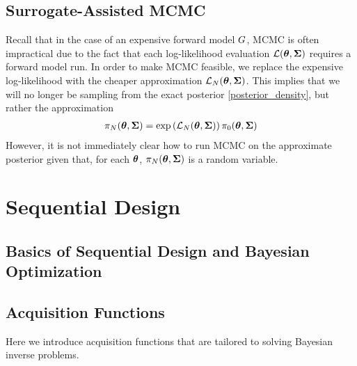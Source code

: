 \documentclass[12pt]{article}
\begin{document}
\subsection{Surrogate-Assisted MCMC}
Recall that in the case of an expensive forward model $G$, MCMC is often impractical due to the fact that each log-likelihood evaluation $\mathcal{L}(\boldsymbol{\theta}, \boldsymbol{\Sigma})$ requires a forward model 
 run. In order to make MCMC feasible, we replace the expensive log-likelihood with the cheaper approximation $\mathcal{L}_{N}(\boldsymbol{\theta}, \boldsymbol{\Sigma})$. This implies that we will no longer be 
 sampling from the exact posterior \ref{posterior_density}, but rather the approximation
 \begin{align}
 \pi_{N}(\boldsymbol{\theta}, \boldsymbol{\Sigma}) = \exp\left(\mathcal{L}_{N}(\boldsymbol{\theta}, \boldsymbol{\Sigma})\right)\pi_0(\boldsymbol{\theta}, \boldsymbol{\Sigma}) \label{approx_posterior_density}
 \end{align}
 However, it is not immediately clear how to run MCMC on the approximate posterior given that, for each $\boldsymbol{\theta}$,  $\pi_{N}(\boldsymbol{\theta}, \boldsymbol{\Sigma})$ is a random variable. 

\section{Sequential Design}

\subsection{Basics of Sequential Design and Bayesian Optimization}

\subsection{Acquisition Functions}
Here we introduce acquisition functions that are tailored to solving Bayesian inverse problems. 
\end{document}
